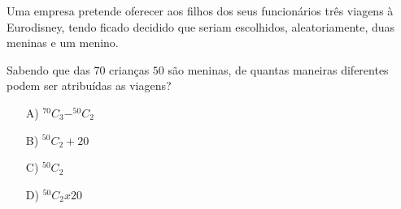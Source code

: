 Uma empresa pretende oferecer aos filhos dos seus funcionários três viagens à Eurodisney, tendo ficado decidido que seriam escolhidos, aleatoriamente, duas meninas e um menino.

Sabendo que das $70$ crianças $50$ são meninas, de quantas maneiras diferentes podem ser atribuídas as viagens?
\begin{enumerate}
\item [A)] $^70C_3 - ^50C_2$
\item [B)] $^50C_2 + 20$
\item [C)] $^50 C_2$
\item [D)] $^50C_2x20$
\end{enumerate}
